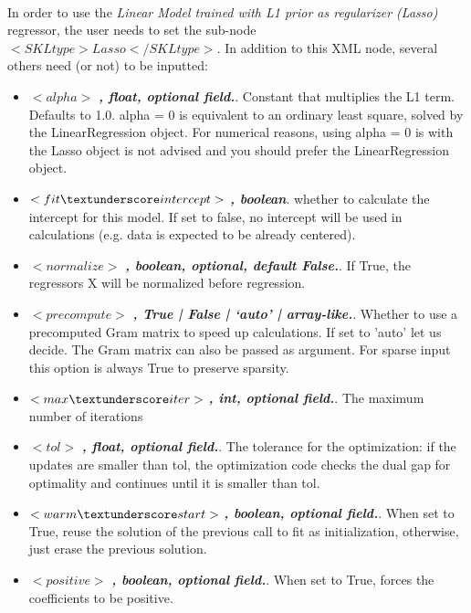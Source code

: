 \\In order to use the \textit{Linear Model trained with L1 prior as regularizer (Lasso)} regressor, the user needs to set the sub-node $<SKLtype>Lasso</SKLtype>$.
In addition to this XML node, several others need (or not) to be inputted:
\begin{itemize}
  \item $<alpha>$ \textbf{\textit{, float, optional field.}}. Constant that multiplies the L1 term. Defaults to 1.0. alpha = 0 is equivalent to an ordinary least square, solved by the LinearRegression object. For numerical reasons, using alpha = 0 is with the Lasso object is not advised and you should prefer the LinearRegression object.
  \item $<fit \textunderscore intercept>$ \textbf{\textit{, boolean}}. whether to calculate the intercept for this model. If set to false, no intercept will be used in calculations (e.g. data is expected to be already centered).
  \item $<normalize>$ \textbf{\textit{, boolean, optional, default False.}}. If True, the regressors X will be normalized before regression.
  \item $<precompute>$ \textbf{\textit{, True | False | ‘auto’ | array-like.}}. Whether to use a precomputed Gram matrix to speed up calculations. If set to 'auto' let us decide. The Gram matrix can also be passed as argument. For sparse input this option is always True to preserve sparsity.
  \item $<max \textunderscore iter>$ \textbf{\textit{, int, optional field.}}. The maximum number of iterations
  \item $<tol>$ \textbf{\textit{, float, optional field.}}. The tolerance for the optimization: if the updates are smaller than tol, the optimization code checks the dual gap for optimality and continues until it is smaller than tol.
  \item $<warm \textunderscore start>$ \textbf{\textit{, boolean, optional field.}}. When set to True, reuse the solution of the previous call to fit as initialization, otherwise, just erase the previous solution.
  \item $<positive>$ \textbf{\textit{, boolean, optional field.}}. When set to True, forces the coefficients to be positive.
\end{itemize}

